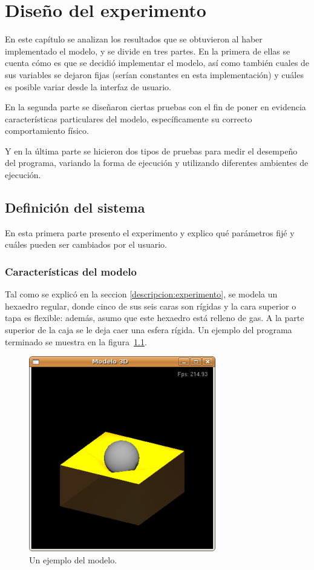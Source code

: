 \chapter{Diseño del experimento}
En este capítulo se analizan los resultados que se obtuvieron al haber implementado el modelo, y se divide en tres partes.
En la primera de ellas se cuenta cómo es que se decidió implementar el modelo, así como también cuales de sus variables se dejaron fijas (serían constantes en esta implementación) y cuáles es posible variar desde la interfaz de usuario.

En la segunda parte se diseñaron ciertas pruebas con el fin de poner en evidencia características particulares del modelo, específicamente su correcto comportamiento físico.

Y en la última parte se hicieron dos tipos de pruebas para medir el desempeño del programa, variando la forma de ejecución y utilizando diferentes ambientes de ejecución.

\section{Definición del sistema}
En esta primera parte presento el experimento y explico qué parámetros fijé y cuáles pueden ser cambiados por el usuario.

\subsection{Características del modelo}
Tal como se explicó en la seccion \ref{descripcion:experimento}, se modela un hexaedro regular, donde cinco de sus seis caras son rígidas y la cara superior o tapa es flexible: además, asumo que este hexaedro está relleno de gas.
A la parte superior de la caja se le deja caer una esfera rígida.
Un ejemplo del programa terminado se muestra en la figura~\ref{programa:portada}.
\begin{figure}
 \centering
 \includegraphics[]{Img/modeloPortada}
 \caption[Ejemplo del programa en ejecución]{Un ejemplo del modelo.}
 \label{programa:portada}
\end{figure}


